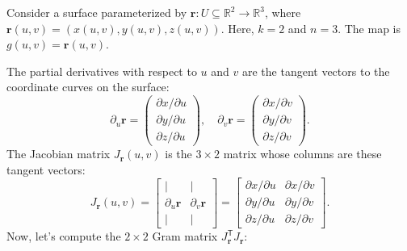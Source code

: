 \documentclass[12pt]{article}
\theoremstyle{definition} %
\theoremstyle{plain} %
\theoremstyle{remark} %
\begin{document}
Consider a surface parameterized by $\mathbf{r}: U \subseteq \mathbb{R}^2 \to \mathbb{R}^3$, where $\mathbf{r}(u,v) = (x(u,v), y(u,v), z(u,v))$. Here, $k=2$ and $n=3$. The map is $g(u,v) = \mathbf{r}(u,v)$.

The partial derivatives with respect to $u$ and $v$ are the tangent vectors to the coordinate curves on the surface:
\[
    \partial_u \mathbf{r} = \begin{pmatrix} \partial x/\partial u \\ \partial y/\partial u \\ \partial z/\partial u \end{pmatrix}, \quad
    \partial_v \mathbf{r} = \begin{pmatrix} \partial x/\partial v \\ \partial y/\partial v \\ \partial z/\partial v \end{pmatrix}.
\]
The Jacobian matrix $J_{\mathbf{r}}(u,v)$ is the $3 \times 2$ matrix whose columns are these tangent vectors:
\[
    J_{\mathbf{r}}(u,v) = \begin{bmatrix} | & | \\ \partial_u \mathbf{r} & \partial_v \mathbf{r} \\ | & | \end{bmatrix} =
    \begin{bmatrix}
        \partial x/\partial u & \partial x/\partial v \\
        \partial y/\partial u & \partial y/\partial v \\
        \partial z/\partial u & \partial z/\partial v
    \end{bmatrix}.
\]
Now, let's compute the $2 \times 2$ Gram matrix $J_{\mathbf{r}}^{\mathsf{T}} J_{\mathbf{r}}$:
\end{document}
